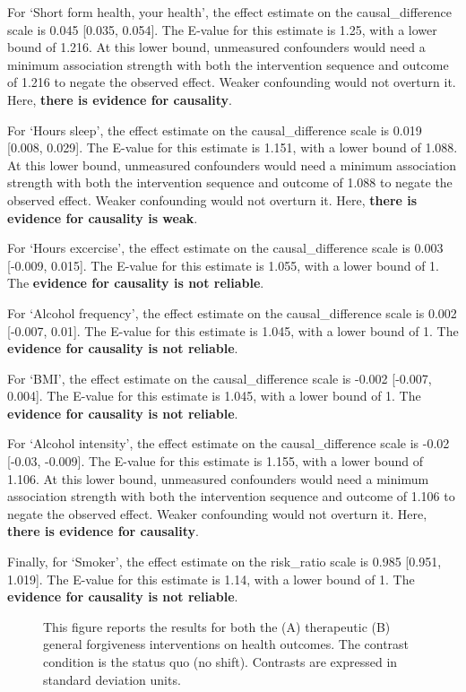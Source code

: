 \documentclass[
  single column]{article}
\begin{document}
For `Short form health, your health', the effect estimate on the
causal\_difference scale is 0.045 {[}0.035, 0.054{]}. The E-value for
this estimate is 1.25, with a lower bound of 1.216. At this lower bound,
unmeasured confounders would need a minimum association strength with
both the intervention sequence and outcome of 1.216 to negate the
observed effect. Weaker confounding would not overturn it. Here,
\textbf{there is evidence for causality}.

For `Hours sleep', the effect estimate on the causal\_difference scale
is 0.019 {[}0.008, 0.029{]}. The E-value for this estimate is 1.151,
with a lower bound of 1.088. At this lower bound, unmeasured confounders
would need a minimum association strength with both the intervention
sequence and outcome of 1.088 to negate the observed effect. Weaker
confounding would not overturn it. Here, \textbf{there is evidence for
causality is weak}.

For `Hours excercise', the effect estimate on the causal\_difference
scale is 0.003 {[}-0.009, 0.015{]}. The E-value for this estimate is
1.055, with a lower bound of 1. The \textbf{evidence for causality is
not reliable}.

For `Alcohol frequency', the effect estimate on the causal\_difference
scale is 0.002 {[}-0.007, 0.01{]}. The E-value for this estimate is
1.045, with a lower bound of 1. The \textbf{evidence for causality is
not reliable}.

For `BMI', the effect estimate on the causal\_difference scale is -0.002
{[}-0.007, 0.004{]}. The E-value for this estimate is 1.045, with a
lower bound of 1. The \textbf{evidence for causality is not reliable}.

For `Alcohol intensity', the effect estimate on the causal\_difference
scale is -0.02 {[}-0.03, -0.009{]}. The E-value for this estimate is
1.155, with a lower bound of 1.106. At this lower bound, unmeasured
confounders would need a minimum association strength with both the
intervention sequence and outcome of 1.106 to negate the observed
effect. Weaker confounding would not overturn it. Here, \textbf{there is
evidence for causality}.

Finally, for `Smoker', the effect estimate on the risk\_ratio scale is
0.985 {[}0.951, 1.019{]}. The E-value for this estimate is 1.14, with a
lower bound of 1. The \textbf{evidence for causality is not reliable}.

\begin{figure}


\caption{\label{fig-1_1}This figure reports the results for both the (A)
therapeutic (B) general forgiveness interventions on health outcomes.
The contrast condition is the status quo (no shift). Contrasts are
expressed in standard deviation units.}

\end{figure}%
\end{document}
